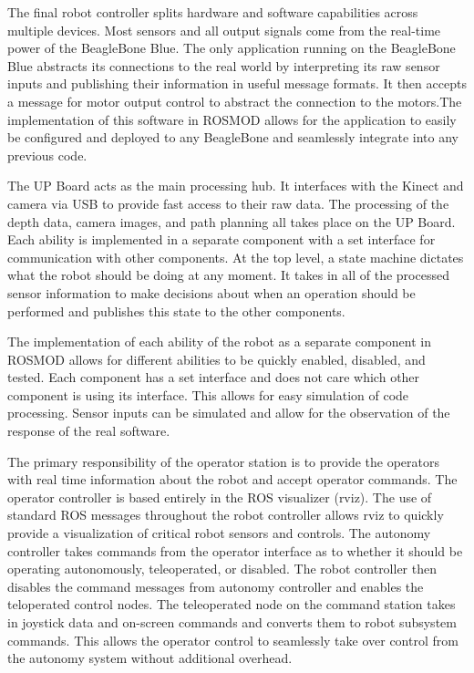 \documentclass[class=article, crop=false]{standalone}
\begin{document}
	The final robot controller splits hardware and software capabilities across multiple devices. Most sensors and all output signals come from the real-time power of the BeagleBone Blue. The only application running on the BeagleBone Blue abstracts its connections to the real world by interpreting its raw sensor inputs and publishing their information in useful message formats. It then accepts a message for motor output control to abstract the connection to the motors.The implementation of this software in ROSMOD allows for the application to easily be configured and deployed to any BeagleBone and seamlessly integrate into any previous code.
	
	The UP Board acts as the main processing hub. It interfaces with the Kinect and camera via USB to provide fast access to their raw data. The processing of the depth data, camera images, and path planning all takes place on the UP Board. Each ability is implemented in a separate component with a set interface for communication with other components. At the top level, a state machine dictates what the robot should be doing at any moment. It takes in all of the processed sensor information to make decisions about when an operation should be performed and publishes this state to the other components.
	
	The implementation of each ability of the robot as a separate component in ROSMOD allows for different abilities to be quickly enabled, disabled, and tested. Each component has a set interface and does not care which other component is using its interface. This allows for easy simulation of code processing. Sensor inputs can be simulated and allow for the observation of the response of the real software.

	
	
	The primary responsibility of the operator station is to provide the operators with real time information about the robot and accept operator commands. The operator controller is based entirely in the ROS visualizer (rviz). The use of standard ROS messages throughout the robot controller allows rviz to quickly provide a visualization of critical robot sensors and controls. The autonomy controller takes commands from the operator interface as to whether it should be operating autonomously, teleoperated, or disabled. The robot controller then disables the command messages from autonomy controller and enables the teloperated control nodes. The teleoperated node on the command station takes in joystick data and on-screen commands and converts them to robot subsystem commands. This allows the operator control to seamlessly take over control from the autonomy system without additional overhead.
	
	
	


	
\end{document}

